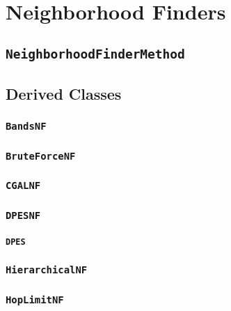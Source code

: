 \chapter{Neighborhood Finders}

\section{\texttt{NeighborhoodFinderMethod}}

\section{Derived Classes}

\subsection{\texttt{BandsNF}}

\subsection{\texttt{BruteForceNF}}

\subsection{\texttt{CGALNF}}

\subsection{\texttt{DPESNF}}

\subsubsection{\texttt{DPES}}

\subsection{\texttt{HierarchicalNF}}

\subsection{\texttt{HopLimitNF}}

